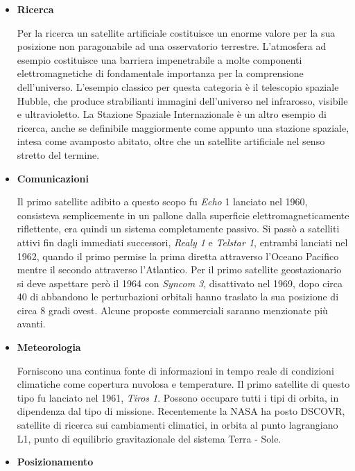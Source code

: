 \documentclass[a4paper]{article}
\begin{document}
			\begin{itemize}
				\item {\bf Ricerca}
				
				Per la ricerca un satellite artificiale costituisce un enorme valore per la sua posizione non paragonabile ad una osservatorio terrestre. L'atmosfera ad esempio costituisce una barriera impenetrabile a molte componenti elettromagnetiche di fondamentale importanza per la comprensione dell'universo. L'esempio classico per questa categoria è il telescopio spaziale Hubble, che produce strabilianti immagini dell'universo nel infrarosso, visibile e ultravioletto. La Stazione Spaziale Internazionale è un altro esempio di ricerca, anche se definibile maggiormente come appunto una stazione spaziale, intesa come avamposto abitato, oltre che un satellite artificiale nel senso stretto del termine.
				
				\item {\bf Comunicazioni}
				
				Il primo satellite adibito a questo scopo fu {\it Echo} 1 lanciato nel 1960, consisteva semplicemente in un pallone dalla superficie elettromagneticamente riflettente, era quindi un sistema completamente passivo. Si passò a satelliti attivi fin dagli immediati successori, {\it Realy 1} e {\it Telstar 1}, entrambi lanciati nel 1962, quando il primo permise la prima diretta attraverso l'Oceano Pacifico mentre il secondo attraverso l'Atlantico. Per il primo satellite geostazionario si deve aspettare però il 1964 con {\it Syncom 3}, disattivato nel 1969, dopo circa 40 di abbandono le perturbazioni orbitali hanno traslato la sua posizione di circa 8 gradi ovest. Alcune proposte commerciali saranno menzionate più avanti.
				
				\item {\bf Meteorologia}
				
				Forniscono una continua fonte di informazioni in tempo reale di condizioni climatiche come copertura nuvolosa e temperature. Il primo satellite di questo tipo fu lanciato nel 1961, {\it Tiros 1}. Possono occupare tutti i tipi di orbita, in dipendenza dal tipo di missione. Recentemente la NASA ha posto DSCOVR, satellite di ricerca sui cambiamenti climatici, in orbita al punto lagrangiano L1, punto di equilibrio gravitazionale del sistema Terra - Sole.
				
				\item {\bf Posizionamento}
				

\end{itemize}
\end{document}
